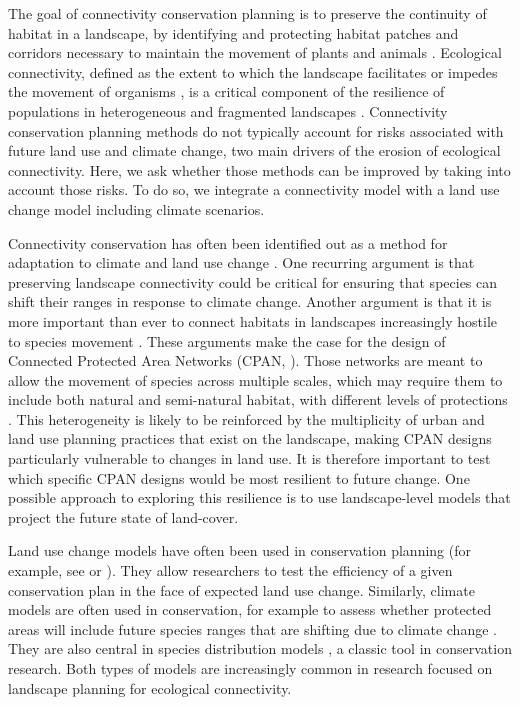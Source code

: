 The goal of connectivity conservation planning is to preserve the continuity of habitat in a landscape, by identifying and protecting habitat patches and corridors necessary to maintain the movement of plants and animals \citep{keeley_thirty_2019}. Ecological connectivity, defined as the extent to which the landscape facilitates or impedes the movement of organisms \citep{crooks_landscape_2006}, is a critical component of the resilience of populations in heterogeneous and fragmented landscapes \citep{gonzalez_spatial_2017}. Connectivity conservation planning methods do not typically account for risks associated with future land use and climate change, two main drivers of the erosion of ecological connectivity. Here, we ask whether those methods can be improved by taking into account those risks. To do so, we integrate a connectivity model with a land use change model including climate scenarios.

Connectivity conservation has often been identified out as a method for adaptation to climate and land use change \citep{costanza_landscape_2019}. One recurring argument is that preserving landscape connectivity could be critical for ensuring that species can shift their ranges \citep{krosby_ecological_2010, keeley_making_2018} in response to climate change. Another argument is that it is more important than ever to connect habitats in landscapes increasingly hostile to species movement \citep{ellis_anthropogenic_2010}. These arguments make the case for the design of Connected Protected Area Networks (CPAN, \cite{opdam_ecological_2006, stewart_corridors_2019, gonzalez_spatial_2017}). Those networks are meant to allow the movement of species across multiple scales, which may require them to include both natural and semi-natural habitat, with different levels of protections \citep{daloia_coupled_2019}. This heterogeneity is likely to be reinforced by the multiplicity of urban and land use planning practices that exist on the landscape, making CPAN designs particularly vulnerable to changes in land use. It is therefore important to test which specific CPAN designs would be most resilient to future  change.  One possible approach to exploring this resilience is to use landscape-level models that project the future state of land-cover.

Land use change models have often been used in conservation planning (for example, see \cite{echeverria_spatially_2008} or \cite{lesschen_identification_2007}). They allow researchers to test the efficiency of a given conservation plan in the face of expected land use change. Similarly, climate models are often used in conservation, for example to assess whether protected areas will include future species ranges that are shifting due to climate change \citep{araujo_would_2004, heller_targeting_2015}. They are also central in species distribution models \citep{porfirio_improving_2014}, a classic tool in conservation research. Both types of models are increasingly common in research focused on landscape planning for ecological connectivity.

